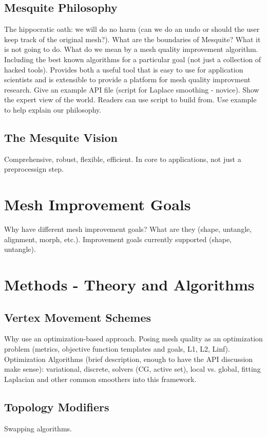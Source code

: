 \subsection{Mesquite Philosophy}
The hippocratic oath: we will do no harm (can we do an undo or should the 
user keep track of the original mesh?).  What are the boundaries of Mesquite?
What it is not going to do. What do we mean by a mesh quality improvement 
algorithm. Including the best known algorithms for a particular goal (not 
just a collection of hacked tools). Provides both a useful tool that is easy
to use for application scientists and is extensible to provide a platform for
mesh quality improvment research. Give an example API file (script for 
Laplace smoothing - novice). Show the expert view of the world. Readers can
use script to build from. Use example to help explain our philosophy.

\subsection{The Mesquite Vision}
Comprehensive, robust, flexible, efficient. In core to applications, not 
just a preprocessign step.

\section{Mesh Improvement Goals}
Why have different mesh improvement goals? What are they (shape, untangle, 
alignment, morph, etc.). Improvement goals currently supported (shape, untangle).

\section{Methods - Theory and Algorithms}

\subsection{Vertex Movement Schemes}
Why use an optimization-based approach. Posing mesh quality as an optimization
problem (metrics, objective function templates and goals, L1, L2, Linf).
Optimization Algorithms (brief description, enough to have the API discussion 
make sense): variational, discrete, solvers (CG, active set), local vs. global,
fitting Laplacian and other common smoothers into this framework.

\subsection{Topology Modifiers}
Swapping algorithms.

